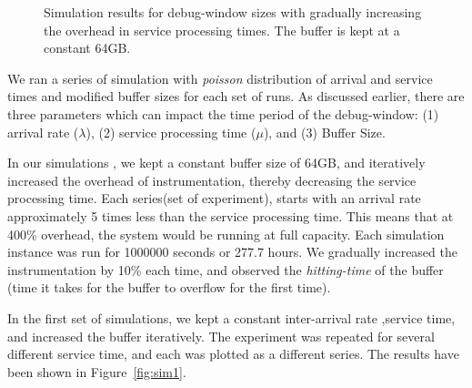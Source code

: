\begin{figure*}[ht]
\begin{adjustbox}{max size={\textwidth}}
	\end{adjustbox}
	\captionsetup{justification=centering}
	\caption{Simulation results for debug-window sizes with gradually increasing the overhead in service processing times. The buffer is kept at a constant 64GB.}
	\label{fig:debugSim}
\end{figure*}


We ran a series of simulation with \textit{poisson} distribution of arrival and service times and modified buffer sizes for each set of runs.
As discussed earlier, there are three parameters which can impact the time period of the debug-window: (1) arrival rate ($\lambda$), (2) service processing time ($\mu$), and (3) Buffer Size.

In our simulations , we kept a constant buffer size of 64GB, and iteratively increased the overhead of instrumentation, thereby decreasing the service processing time.
Each series(set of experiment), starts with an arrival rate approximately 5 times less than the service processing time. 
This means that at 400\% overhead, the system would be running at full capacity.
Each simulation instance was run for 1000000 seconds or 277.7 hours.
We gradually increased the instrumentation by 10\% each time, and observed the \textit{hitting-time} of the buffer (time it takes for the buffer to overflow for the first time).

In the first set of simulations, we kept a constant inter-arrival rate ,service time, and increased the buffer iteratively. 
The experiment was repeated for several different service time, and each was plotted as a different series.
The results have been shown in Figure~\ref{fig:sim1}.

